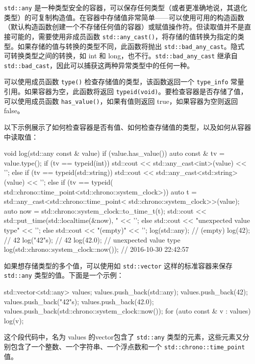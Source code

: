 
\verb|std::any| 是一种类型安全的容器，可以保存任何类型（或者更准确地说，其退化类型）的可复制构造值。在容器中存储值非常简单——可以使用可用的构造函数（默认构造函数创建一个不存储任何值的容器）或赋值操作符。但读取值并不是直接可能的，需要使用非成员函数 \verb|std::any_cast()|，将存储的值转换为指定的类型。如果存储的值与转换的类型不同，此函数将抛出 \verb|std::bad_any_cast|。隐式可转换类型之间的转换，如 int 和 long，也不行。\verb|std::bad_any_cast| 继承自 \verb|std::bad_cast|，因此可以捕获这两种异常类型中的任何一种。

可以使用成员函数 \verb|type()| 检查存储值的类型，该函数返回一个 \verb|type_info| 常量引用。如果容器为空，此函数将返回 \verb|typeid(void)|。要检查容器是否存储了值，可以使用成员函数 \verb|has_value()|，如果有值则返回 true，如果容器为空则返回 false。

以下示例展示了如何检查容器是否有值、如何检查存储值的类型，以及如何从容器中读取值：

\begin{cpp}
void log(std::any const & value)
{
    if (value.has_value())
    {
        auto const & tv = value.type();
        if (tv == typeid(int))
        {
            std::cout << std::any_cast<int>(value) << '\n';
        }
        else if (tv == typeid(std::string))
        {
            std::cout << std::any_cast<std::string>(value) << '\n';
        }
        else if (tv == typeid(
        std::chrono::time_point<std::chrono::system_clock>))
        {
            auto t = std::any_cast<std::chrono::time_point<
                std::chrono::system_clock>>(value);
            auto now = std::chrono::system_clock::to_time_t(t);
            std::cout << std::put_time(std::localtime(&now), "%
                      << '\n';
        }
        else
        {
            std::cout << "unexpected value type" << '\n';
        }
    }
    else
    {
        std::cout << "(empty)" << '\n';
    }
}
log(std::any{});                       // (empty)
log(42);                               // 42
log("42"s);                            // 42
log(42.0);                             // unexpected value type
log(std::chrono::system_clock::now()); // 2016-10-30 22:42:57
\end{cpp}

如果想存储类型的多个值，可以使用如 \verb|std::vector| 这样的标准容器来保存 \verb|std::any| 类型的值。下面是一个示例：

\begin{cpp}
std::vector<std::any> values;
values.push_back(std::any{});
values.push_back(42);
values.push_back("42"s);
values.push_back(42.0);
values.push_back(std::chrono::system_clock::now());
for (auto const & v : values)
    log(v);
\end{cpp}

这个段代码中，名为 values 的vector包含了 \verb|std::any| 类型的元素，这些元素又分别包含了一个整数、一个字符串、一个浮点数和一个 \verb|std::chrono::time_point| 值。


